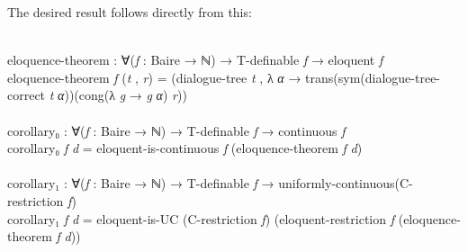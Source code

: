 \documentclass{entcs} \usepackage{prentcsmacro}
\newcommand{\AgdaFontStyle}[1]{\textsf{#1}}
\newcommand{\AgdaBoundFontStyle}[1]{\textit{#1}}
\newcommand{\AgdaSymbol}      [1]{\textcolor{AgdaSymbol}{#1}}
\newcommand{\AgdaBound}    [1]{\AgdaBoundFontStyle{\textcolor{AgdaBound}{#1}}}
\newcommand{\AgdaInductiveConstructor}[1]
    {\AgdaFontStyle{\textcolor{AgdaInductiveConstructor}{#1}}}
\newcommand{\AgdaDatatype} [1]{\AgdaFontStyle{\textcolor{AgdaDatatype}{#1}}}
\newcommand{\AgdaFunction} [1]{\AgdaFontStyle{\textcolor{AgdaFunction}{#1}}}
\newcommand{\AgdaCodeStyle}{\small}
\newenvironment{code}%
{\noindent\AgdaCodeStyle\pboxed}%
{\endpboxed\par\noindent%
\ignorespacesafterend}
\begin{document}
\noindent The desired result follows directly from this:

\begin{code}\>\<%
\\
\>\AgdaFunction{eloquence-theorem} \AgdaSymbol{:} \AgdaSymbol{∀(}\AgdaBound{f} \AgdaSymbol{:} \AgdaFunction{Baire} \AgdaSymbol{→} \AgdaDatatype{ℕ}\AgdaSymbol{)} \AgdaSymbol{→} \AgdaFunction{T-definable} \AgdaBound{f} \AgdaSymbol{→} \AgdaFunction{eloquent} \AgdaBound{f}\<%
\\
\>\AgdaFunction{eloquence-theorem} \AgdaBound{f} \AgdaSymbol{(}\AgdaBound{t} \AgdaInductiveConstructor{,} \AgdaBound{r}\AgdaSymbol{)} \AgdaSymbol{=} \AgdaSymbol{(}\AgdaFunction{dialogue-tree} \AgdaBound{t} \AgdaInductiveConstructor{,} \AgdaSymbol{λ} \AgdaBound{α} \AgdaSymbol{→} \AgdaFunction{trans}\AgdaSymbol{(}\AgdaFunction{sym}\AgdaSymbol{(}\AgdaFunction{dialogue-tree-correct} \AgdaBound{t} \AgdaBound{α}\AgdaSymbol{))(}\AgdaFunction{cong}\AgdaSymbol{(λ} \AgdaBound{g} \AgdaSymbol{→} \AgdaBound{g} \AgdaBound{α}\AgdaSymbol{)} \AgdaBound{r}\AgdaSymbol{))}\<%
\\
%
\\
\>\AgdaFunction{corollary₀} \AgdaSymbol{:} \AgdaSymbol{∀(}\AgdaBound{f} \AgdaSymbol{:} \AgdaFunction{Baire} \AgdaSymbol{→} \AgdaDatatype{ℕ}\AgdaSymbol{)} \AgdaSymbol{→} \AgdaFunction{T-definable} \AgdaBound{f} \AgdaSymbol{→} \AgdaFunction{continuous} \AgdaBound{f}\<%
\\
\>\AgdaFunction{corollary₀} \AgdaBound{f} \AgdaBound{d} \AgdaSymbol{=} \AgdaFunction{eloquent-is-continuous} \AgdaBound{f} \AgdaSymbol{(}\AgdaFunction{eloquence-theorem} \AgdaBound{f} \AgdaBound{d}\AgdaSymbol{)}\<%
\\
%
\\
\>\AgdaFunction{corollary₁} \AgdaSymbol{:} \AgdaSymbol{∀(}\AgdaBound{f} \AgdaSymbol{:} \AgdaFunction{Baire} \AgdaSymbol{→} \AgdaDatatype{ℕ}\AgdaSymbol{)} \AgdaSymbol{→} \AgdaFunction{T-definable} \AgdaBound{f} \AgdaSymbol{→} \AgdaFunction{uniformly-continuous}\AgdaSymbol{(}\AgdaFunction{C-restriction} \AgdaBound{f}\AgdaSymbol{)} \<[86]%
\>[86]\<%
\\
\>\AgdaFunction{corollary₁} \AgdaBound{f} \AgdaBound{d} \AgdaSymbol{=} \AgdaFunction{eloquent-is-UC} \AgdaSymbol{(}\AgdaFunction{C-restriction} \AgdaBound{f}\AgdaSymbol{)} \AgdaSymbol{(}\AgdaFunction{eloquent-restriction} \AgdaBound{f} \AgdaSymbol{(}\AgdaFunction{eloquence-theorem} \AgdaBound{f} \AgdaBound{d}\AgdaSymbol{))}\<%
\\
\>\<\end{code} 
\end{document}
